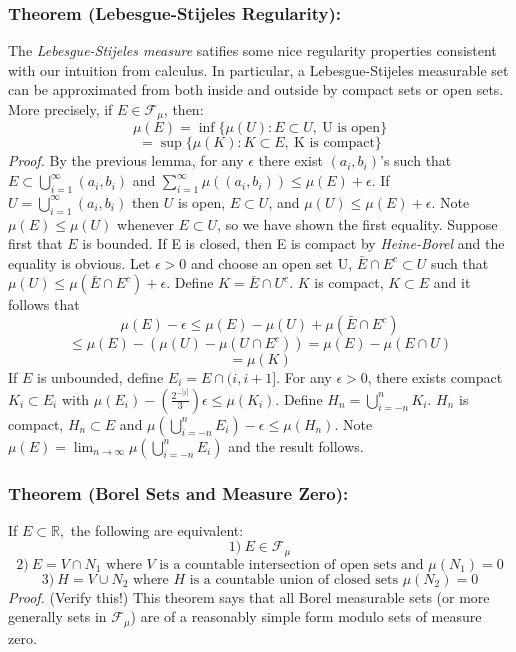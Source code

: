 \documentclass{article}
\begin{document}
\subsubsection{Theorem (Lebesgue-Stijeles Regularity):}
The \emph{Lebesgue-Stijeles measure} satifies some nice regularity properties consistent with our intuition from calculus. In particular, a Lebesgue-Stijeles measurable set can be approximated from both inside and outside by compact sets or open sets.  \newline \newline
More precisely, if $E  \in \mathcal{F}_\mu$, then:
\[
\mu(E)=\inf\{\mu(U) : E\subset U, \ \text{U is open}\}
\]
\[
=\sup\{\mu(K) : K\subset E, \ \text{K is compact}\}
\]
\textit{Proof.} \newline \newline
By the previous lemma, for any $\epsilon$ there exist $(a_i,b_i)$'s such that $E\subset\bigcup_{i=1}^{\infty}(a_i,b_i)$ and $\sum_{i=1}^{\infty}\mu((a_i,b_i))\leq \mu(E)+\epsilon$. If $U=\bigcup_{i=1}^{\infty}(a_i,b_i)$ then $U$ is open, $E\subset U$, and $\mu(U)\leq\mu(E)+\epsilon$. Note $\mu(E) \leq\mu(U) $ whenever $E \subset U$, so we have shown the first equality. \newline \newline
Suppose first that $E$ is bounded. If E is closed, then E is compact by \emph{Heine-Borel} and the equality is obvious. Let $\epsilon>0$ and choose an open set U, $\bar{E}\cap E^c\subset U$ such that $\mu(U)\leq\mu(\bar{E}\cap E^c)+\epsilon$. Define $K=\bar{E}\cap U^c$. $K$ is compact, $K\subset E$ and it follows that 
\[
\mu(E)-\epsilon\leq\mu(E)-\mu(U)+\mu(\bar{E}\cap E^c)
\]
\[
\leq\mu(E)-(\mu(U)-\mu(U\cap E^c))=\mu(E) -\mu(E\cap U)
\]
\[
=\mu(K)
\]
If $E$ is unbounded, define $E_i=E\cap(i,i+1]$. For any $\epsilon>0$, there exists compact $K_i\subset E_i$ with $\mu(E_i)-(\frac{2^{-|i|}}{3})\epsilon\leq\mu(K_i)$. Define $H_n=\bigcup_{i=-n}^n{K_i}$. $H_n$ is compact, $H_n\subset E$ and $\mu(\bigcup_{i=-n}^n{E_i})-\epsilon\leq\mu(H_n)$. Note $\mu(E)=\lim_{n\to\infty}\mu(\bigcup_{i=-n}^n{E_i})$ and the result follows. 
\subsubsection{Theorem (Borel Sets and Measure Zero):}
If $E \subset\mathbb{R}, $ the following are equivalent:
\[
1) \ E \in \mathcal{F}_\mu
\]
\[
2) \ E = V\cap N_1 \text{ where } V \text{ is a countable intersection of open sets and } \mu(N_1)=0
\]
\[
3) \ H = V\cup N_2 \text{ where } H \text{ is a countable union of closed sets } \mu(N_2)=0
\]
\textit{Proof.}\newline \newline 
(Verify this!)
\newline \newline 
This theorem says that all Borel measurable sets (or more generally sets in $\mathcal{F}_\mu$) are of a reasonably simple form modulo sets of measure zero.
\end{document}

